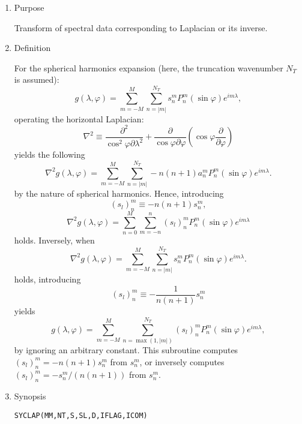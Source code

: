 \documentclass[a4paper]{scrartcl}
\begin{document}
\begin{enumerate}

\item Purpose

Transform of spectral data 
corresponding to Laplacian or its inverse.

\item Definition
  
For the spherical harmonics expansion (here, the truncation
wavenumber  $N_T$ is assumed):
\begin{equation}
g(\lambda,\varphi)=\sum^M_{m=-M}\sum^{N_T}_{n=|m|}
s^m_nP^m_n(\sin\varphi)e^{im\lambda},
\end{equation}
operating the horizontal Laplacian:
\begin{equation}
\nabla^2\equiv
\frac{\partial^2}{\cos^2\varphi\partial\lambda^2}
+\frac{\partial}{\cos\varphi\partial\varphi}\left(\cos\varphi\frac{\partial}{\partial\varphi}\right)
\end{equation}
yields the following 
\begin{equation}
\nabla^2 g(\lambda,\varphi)
=\sum^M_{m=-M}\sum^{N_T}_{n=|m|}-n(n+1)a^m_nP^m_n(\sin\varphi)e^{im\lambda}.
\end{equation}
by the nature of spherical harmonics.
Hence, 
introducing
\begin{equation}
(s_l)^m_n\equiv -n(n+1)s^m_n,
\end{equation}
\begin{equation}
\nabla^2 g(\lambda,\varphi)
=\sum^M_{n=0}\sum^n_{m=-n}(s_l)^m_nP^m_n(\sin\varphi)e^{im\lambda}
\end{equation}
holds. 
Inversely, when
\begin{equation}
\nabla^2 g(\lambda,\varphi)
=\sum^M_{m=-M}\sum^{N_T}_{n=|m|}s^m_nP^m_n(\sin\varphi)e^{im\lambda}.
\end{equation}
holds, introducing
\begin{equation}
(s_l)^m_n\equiv -\frac1{n(n+1)}s^m_n
\end{equation}
yields
\begin{equation}
g(\lambda,\varphi)
=\sum^M_{m=-M}\sum^{N_T}_{n=\max(1,|m|)}
(s_l)^m_nP^m_n(\sin\varphi)e^{im\lambda},
\end{equation}
by ignoring an arbitrary constant.
This subroutine computes $(s_l)^m_n = -n(n+1)s^m_n$
from $s^m_n$, or inversely computes $(s_l)^m_n = -s^m_n/(n(n+1))$
from $s^m_n$.

\item Synopsis 
    
\texttt{SYCLAP(MM,NT,S,SL,D,IFLAG,ICOM)}
  

\end{enumerate}
\end{document}
